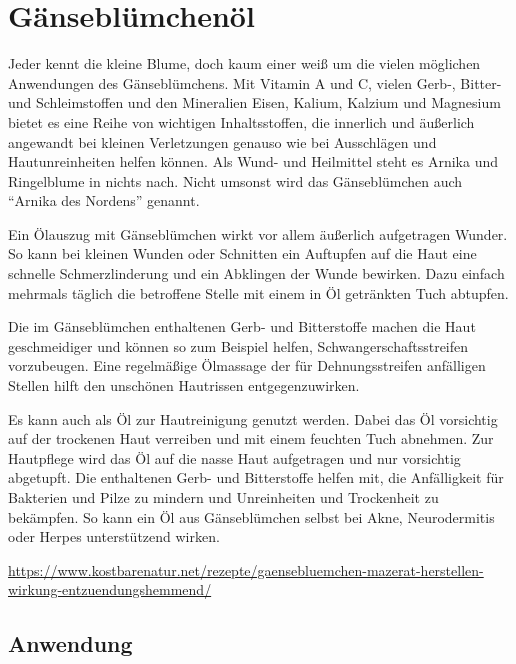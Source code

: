 


\newpage



\section{Gänseblümchenöl}

Jeder kennt die kleine Blume, doch kaum einer weiß um die vielen möglichen Anwendungen des Gänseblümchens. Mit Vitamin A und C, vielen Gerb-, Bitter- und Schleimstoffen und den Mineralien Eisen, Kalium, Kalzium und Magnesium bietet es eine Reihe von wichtigen Inhaltsstoffen, die innerlich und äußerlich angewandt bei kleinen Verletzungen genauso wie bei Ausschlägen und Hautunreinheiten helfen können. Als Wund- und Heilmittel steht es Arnika und Ringelblume in nichts nach. Nicht umsonst wird das Gänseblümchen auch “Arnika des Nordens” genannt.

Ein Ölauszug mit Gänseblümchen wirkt vor allem äußerlich aufgetragen Wunder. So kann bei kleinen Wunden oder Schnitten ein Auftupfen auf die Haut eine schnelle Schmerzlinderung und ein Abklingen der Wunde bewirken. Dazu einfach mehrmals täglich die betroffene Stelle mit einem in Öl getränkten Tuch abtupfen.

Die im Gänseblümchen enthaltenen Gerb- und Bitterstoffe machen die Haut geschmeidiger und können so zum Beispiel helfen, Schwangerschaftsstreifen vorzubeugen. Eine regelmäßige Ölmassage der für Dehnungsstreifen anfälligen Stellen hilft den unschönen Hautrissen entgegenzuwirken.

Es kann auch als Öl zur Hautreinigung genutzt werden. Dabei das Öl vorsichtig auf der trockenen Haut verreiben und mit einem feuchten Tuch abnehmen. Zur Hautpflege wird das Öl auf die nasse Haut aufgetragen und nur vorsichtig abgetupft. Die enthaltenen Gerb- und Bitterstoffe helfen mit, die Anfälligkeit für Bakterien und Pilze zu mindern und Unreinheiten und Trockenheit zu bekämpfen. So kann ein Öl aus Gänseblümchen selbst bei Akne, Neurodermitis oder Herpes unterstützend wirken.

\url{https://www.kostbarenatur.net/rezepte/gaensebluemchen-mazerat-herstellen-wirkung-entzuendungshemmend/}


\subsection{Anwendung}
